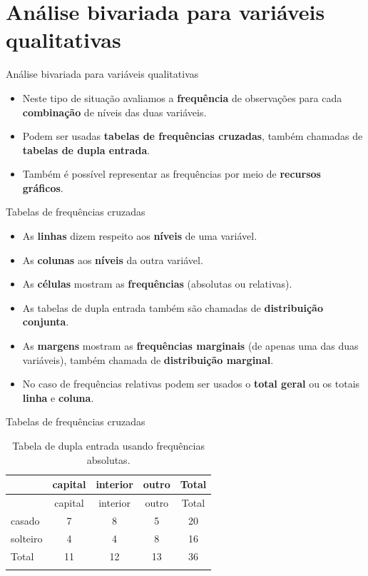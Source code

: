 \documentclass[
  ignorenonframetext,
  serif,
  professionalfont,
  usenames,
  dvipsnames,
  aspectratio = 169]{beamer}
\providecommand{\tightlist}{%
  \setlength{\itemsep}{0pt}\setlength{\parskip}{0pt}}
\renewcommand{\tightlist}{%
  \setlength{\itemsep}{0\baselineskip}
  \setlength{\parskip}{0.25\baselineskip}
}
\begin{document}
\section{Análise bivariada para variáveis
qualitativas}\label{anuxe1lise-bivariada-para-variuxe1veis-qualitativas}

\begin{frame}{Análise bivariada para variáveis qualitativas}
\label{anuxe1lise-bivariada-para-variuxe1veis-qualitativas-1}
\begin{itemize}
\item
  Neste tipo de situação avaliamos a \textbf{frequência} de observações
  para cada \textbf{combinação} de níveis das duas variáveis.
\item
  Podem ser usadas \textbf{tabelas de frequências cruzadas}, também
  chamadas de \textbf{tabelas de dupla entrada}.
\item
  Também é possível representar as frequências por meio de
  \textbf{recursos gráficos}.
\end{itemize}
\end{frame}

\begin{frame}{Tabelas de frequências cruzadas}
\label{tabelas-de-frequuxeancias-cruzadas}
\begin{itemize}
\tightlist
\item
  As \textbf{linhas} dizem respeito aos \textbf{níveis} de uma variável.
\item
  As \textbf{colunas} aos \textbf{níveis} da outra variável.
\item
  As \textbf{células} mostram as \textbf{frequências} (absolutas ou
  relativas).
\item
  As tabelas de dupla entrada também são chamadas de
  \textbf{distribuição conjunta}.
\item
  As \textbf{margens} mostram as \textbf{frequências marginais} (de
  apenas uma das duas variáveis), também chamada de
  \textbf{distribuição marginal}.
\item
  No caso de frequências relativas podem ser usados o
  \textbf{total geral} ou os totais \textbf{linha} e \textbf{coluna}.
\end{itemize}
\end{frame}

\begin{frame}{Tabelas de frequências cruzadas}
\label{tabelas-de-frequuxeancias-cruzadas-1}
\begin{longtable}[]{@{}lcccc@{}}
\caption{Tabela de dupla entrada usando frequências
absolutas.}\tabularnewline
\toprule\noalign{}
& capital & interior & outro & Total \\
\midrule\noalign{}
\endfirsthead
\toprule\noalign{}
& capital & interior & outro & Total \\
\midrule\noalign{}
\endhead
casado & 7 & 8 & 5 & 20 \\
solteiro & 4 & 4 & 8 & 16 \\
Total & 11 & 12 & 13 & 36 \\
\bottomrule\noalign{}
\end{longtable}
\end{frame}
\end{document}
